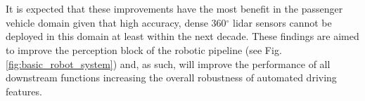 \\\\
It is expected that these improvements have the most benefit in the passenger vehicle domain given that high accuracy, dense 360$^{\circ}$ lidar sensors cannot be deployed in this domain at least within the next decade. These findings are aimed to improve the perception block of the robotic pipeline (see Fig. \ref{fig:basic_robot_system}) and, as such, will improve the performance of all downstream functions increasing the overall robustness of automated driving features.